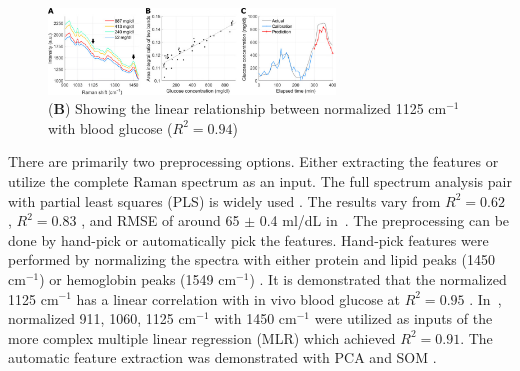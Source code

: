 \begin{figure}
    \caption{(\textbf{B}) Showing the linear relationship between normalized 1125 $\text{cm}^{-1}$ with blood glucose ($R^2 = 0.94$) \citep{directGlucose}}
    \centerline{\includegraphics[width=3in]{figures/bloodGlucose-relative1125-directGlucose.jpeg}}\label{fig:bloodGlucose-relative1125-directGlucose}
\end{figure}

There are primarily two preprocessing options. 
Either extracting the features or utilize the complete Raman spectrum as an input.
The full spectrum analysis pair with partial least squares (PLS) is widely used \citep{forearm2014, sitecompare, forearm2005, directGlucose}.
The results vary from $R^2 = 0.62$ \citep{directGlucose}, $R^2 = 0.83$ \citep{forearm2005,forearm2014}, and RMSE of around 65 $\pm$ 0.4 ml/dL in~\cite{sitecompare}.
The preprocessing can be done by hand-pick \citep{directGlucose,solutionGlucose} or automatically \citep{ramanNailFold2019, sitecompare} pick the features.
Hand-pick features were performed by normalizing the spectra with either protein and lipid peaks (1450 $\text{cm}^{-1}$) \citep{directGlucose} or hemoglobin peaks (1549 $\text{cm}^{-1}$) \citep{solutionGlucose}.
It is demonstrated that the normalized 1125 $\text{cm}^{-1}$ has a linear correlation with in vivo blood glucose at $R^2 = 0.95$ \citep{solutionGlucose}.
In~\cite{directGlucose}, normalized 911, 1060, 1125 $\text{cm}^{-1}$ with 1450 $\text{cm}^{-1}$ were utilized as inputs of the more complex multiple linear regression (MLR) which achieved $R^2 = 0.91$.
The automatic feature extraction was demonstrated with PCA \citep{ramanNailFold2019} and SOM \citep{sitecompare}.





